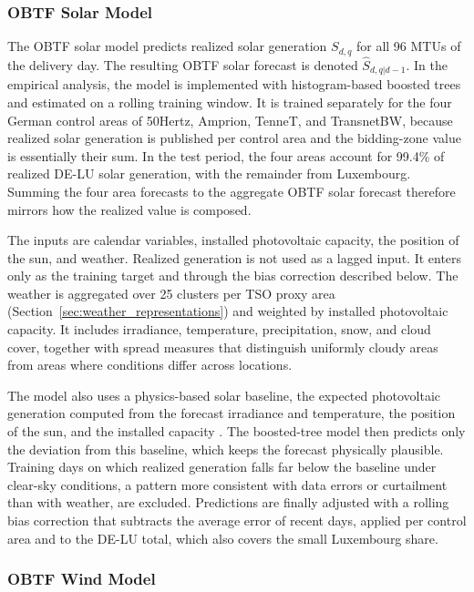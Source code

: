 \subsubsection{OBTF Solar Model}
\label{sec:solar_model}

The OBTF solar model predicts realized solar generation \(S_{d,q}\) for all 96
MTUs of the delivery day. The resulting OBTF solar forecast is denoted
\(\hat{S}_{d,q|d-1}\). In the empirical analysis, the model is implemented
with histogram-based boosted trees and estimated on a rolling training window.
It is trained separately for the four German control areas of 50Hertz,
Amprion, TenneT, and TransnetBW, because realized solar generation is published
per control area and the bidding-zone value is essentially their sum. In the
test period, the four areas account for 99.4\% of realized \mbox{DE-LU} solar
generation, with the remainder from Luxembourg. Summing the four area forecasts
to the aggregate OBTF solar forecast therefore mirrors how the realized
value is composed.

The inputs are calendar variables, installed photovoltaic capacity, the position
of the sun, and weather. Realized generation is not used as a lagged input. It
enters only as the training target and through the bias correction described
below. The weather is aggregated over 25 clusters per TSO proxy area
(Section~\ref{sec:weather_representations}) and weighted by installed
photovoltaic capacity. It includes irradiance, temperature,
precipitation, snow, and cloud cover, together with spread measures that
distinguish uniformly cloudy areas from areas where conditions differ across
locations.

The model also uses a physics-based solar baseline, the expected photovoltaic
generation computed from the forecast irradiance and temperature, the position
of the sun, and the installed capacity \cite{antonanzas2016pvForecasting}. The
boosted-tree model then predicts only the deviation from this baseline, which
keeps the forecast physically plausible. Training days on which realized
generation falls far below the baseline under clear-sky conditions, a pattern
more consistent with data errors or curtailment than with weather, are
excluded. Predictions are finally adjusted with a rolling bias correction that
subtracts the average error of recent days, applied per control area and to the
\mbox{DE-LU} total, which also covers the small Luxembourg share.

\subsubsection{OBTF Wind Model}
\label{sec:wind_model}

